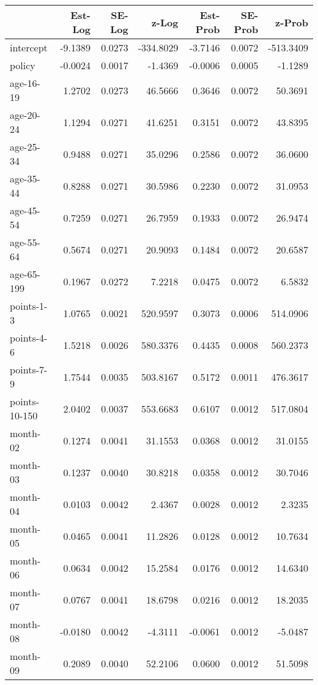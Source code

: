 \documentclass[10pt]{article}
\begin{document}
\begin{table}[ht]
\centering
\begin{tabular}{lrrrrrr}
  \hline
 & Est-Log & SE-Log & z-Log & Est-Prob & SE-Prob & z-Prob \\ 
  \hline
intercept & -9.1389 & 0.0273 & -334.8029 & -3.7146 & 0.0072 & -513.3409 \\ 
  policy & -0.0024 & 0.0017 & -1.4369 & -0.0006 & 0.0005 & -1.1289 \\ 
  age-16-19 & 1.2702 & 0.0273 & 46.5666 & 0.3646 & 0.0072 & 50.3691 \\ 
  age-20-24 & 1.1294 & 0.0271 & 41.6251 & 0.3151 & 0.0072 & 43.8395 \\ 
  age-25-34 & 0.9488 & 0.0271 & 35.0296 & 0.2586 & 0.0072 & 36.0600 \\ 
  age-35-44 & 0.8288 & 0.0271 & 30.5986 & 0.2230 & 0.0072 & 31.0953 \\ 
  age-45-54 & 0.7259 & 0.0271 & 26.7959 & 0.1933 & 0.0072 & 26.9474 \\ 
  age-55-64 & 0.5674 & 0.0271 & 20.9093 & 0.1484 & 0.0072 & 20.6587 \\ 
  age-65-199 & 0.1967 & 0.0272 & 7.2218 & 0.0475 & 0.0072 & 6.5832 \\ 
  points-1-3 & 1.0765 & 0.0021 & 520.9597 & 0.3073 & 0.0006 & 514.0906 \\ 
  points-4-6 & 1.5218 & 0.0026 & 580.3376 & 0.4435 & 0.0008 & 560.2373 \\ 
  points-7-9 & 1.7544 & 0.0035 & 503.8167 & 0.5172 & 0.0011 & 476.3617 \\ 
  points-10-150 & 2.0402 & 0.0037 & 553.6683 & 0.6107 & 0.0012 & 517.0804 \\ 
  month-02 & 0.1274 & 0.0041 & 31.1553 & 0.0368 & 0.0012 & 31.0155 \\ 
  month-03 & 0.1237 & 0.0040 & 30.8218 & 0.0358 & 0.0012 & 30.7046 \\ 
  month-04 & 0.0103 & 0.0042 & 2.4367 & 0.0028 & 0.0012 & 2.3235 \\ 
  month-05 & 0.0465 & 0.0041 & 11.2826 & 0.0128 & 0.0012 & 10.7634 \\ 
  month-06 & 0.0634 & 0.0042 & 15.2584 & 0.0176 & 0.0012 & 14.6340 \\ 
  month-07 & 0.0767 & 0.0041 & 18.6798 & 0.0216 & 0.0012 & 18.2035 \\ 
  month-08 & -0.0180 & 0.0042 & -4.3111 & -0.0061 & 0.0012 & -5.0487 \\ 
  month-09 & 0.2089 & 0.0040 & 52.2106 & 0.0600 & 0.0012 & 51.5098 \\ 

\end{tabular}
\end{table}
\end{document}
